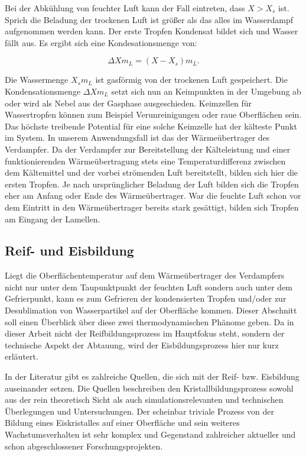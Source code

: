 Bei der Abkühlung von feuchter Luft kann der Fall eintreten, dass $X > X_s$ ist. Sprich die Beladung der trockenen Luft ist größer als das alles im Wasserdampf aufgenommen werden kann. Der erste Tropfen Kondensat bildet sich und Wasser fällt aus. Es ergibt sich eine Kondesationsmenge von:

\begin{equation}
\Delta X m_L = (X - X_s)m_L.
\label{eq:Delta_X}
\end{equation}

Die Wassermenge $X_s m_L$ ist gasförmig von der trockenen Luft gespeichert. Die Kondensationsmenge $\Delta X m_L$ setzt sich nun an Keimpunkten in der Umgebung ab oder wird als Nebel aus der Gasphase ausgeschieden. Keimzellen für Wassertropfen können zum Beispiel Verunreinigungen oder raue Oberflächen sein. Das höchste treibende Potential für eine solche Keimzelle hat der kälteste Punkt im System. In unserem Anwendungsfall ist das der Wärmeübertrager des Verdampfer. Da der Verdampfer zur Bereitstellung der Kälteleistung und einer funktionierenden Wärmeübertragung stets eine Temperaturdifferenz zwischen dem Kältemittel und der vorbei strömenden Luft  bereitstellt,  bilden sich hier die ersten Tropfen. Je nach ursprünglicher Beladung der Luft bilden sich die Tropfen eher am Anfang oder Ende des Wärmeübertrager. War die feuchte Luft schon vor dem Eintritt in den Wärmeübertrager bereits stark gesättigt, bilden sich Tropfen am Eingang der Lamellen. 
\citep{Baehr2013}


\subsection{Reif- und Eisbildung}
\label{subsec:Reifbildung}

Liegt die Oberflächentemperatur auf dem Wärmeübertrager des Verdampfers nicht nur unter dem Taupunktpunkt der feuchten Luft sondern auch unter dem Gefrierpunkt, kann es zum Gefrieren der kondensierten Tropfen und/oder zur Desublimation von Wasserpartikel auf der Oberfläche kommen. Dieser Abschnitt soll einen Überblick über diese zwei thermodynamischen Phänome geben. Da in dieser Arbeit nicht der Reifbildungsprozess im Hauptfokus steht, sondern  der technische Aspekt der Abtauung, wird der Eisbildungsprozess hier nur kurz erläutert.

In der Literatur gibt es zahlreiche Quellen, die sich mit der Reif- bzw. Eisbildung auseinander setzen. Die Quellen beschreiben den Kristallbildungsprozess sowohl aus der rein theoretisch Sicht als auch simulationsrelevanten und technischen Überlegungen und Untersuchungen. Der scheinbar triviale Prozess von der Bildung eines Eiskristalles auf einer Oberfläche und sein weiteres Wachstumsverhalten ist sehr komplex und Gegenstand zahlreicher aktueller und schon abgeschlossener Forschungsprojekten.

